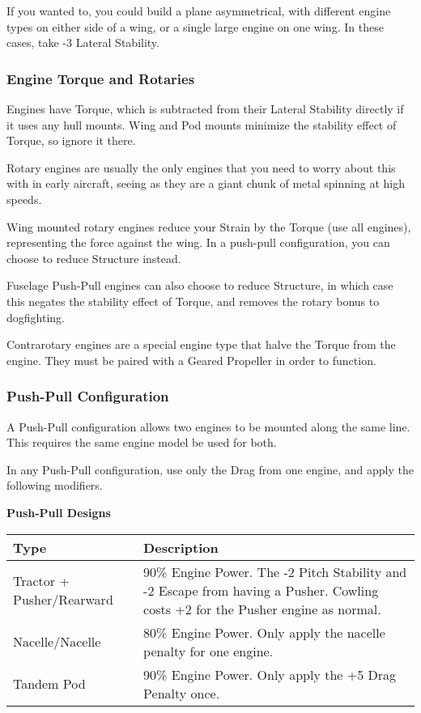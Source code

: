 \documentclass{article}
\begin{document}
If you wanted to, you could build a plane asymmetrical, with
different engine types on either side of a wing, or a single large
engine on one wing. In these cases, take -3 Lateral Stability.

\subsubsection{Engine Torque and Rotaries}
\label{_Engine Torque and Rotaries}

Engines have Torque, which is subtracted from their Lateral Stability
directly if it uses any hull mounts. Wing and Pod mounts minimize the
stability effect of Torque, so ignore it there.

Rotary engines are usually the only engines that you need to worry about
this with in early aircraft, seeing as they are a giant chunk of metal
spinning at high speeds.

Wing mounted rotary engines reduce your Strain by the Torque (use all
engines), representing the force against the wing. In a push-pull
configuration, you can choose to reduce Structure instead.

Fuselage Push-Pull engines can also choose to reduce Structure, in which
case this negates the stability effect of Torque, and removes the rotary
bonus to dogfighting.

Contrarotary engines are a special engine type that halve the Torque
from the engine. They must be paired with a Geared Propeller in order to
function.

\subsubsection{Push-Pull Configuration}
\label{_Push-Pull Configuration}

A Push-Pull configuration allows two engines to be mounted along the
same line. This requires the same engine model be used for both.

In any Push-Pull configuration, use only the Drag from one engine, and
apply the following modifiers.

\textbf{Push-Pull Designs}

\begin{tabular}{|l|l|}
    \hline
    Type                      & Description                                             \\\hline
    Tractor + Pusher/Rearward & 90\% Engine Power. The -2 Pitch Stability
    and -2 Escape from having a Pusher. Cowling costs +2 for the Pusher
    engine as normal.                                                                   \\\hline
    Nacelle/Nacelle           & 80\% Engine Power. Only apply the nacelle penalty for
    one engine.                                                                         \\\hline
    Tandem Pod                & 90\% Engine Power. Only apply the +5 Drag Penalty once. \\\hline
\end{tabular}
\end{document}
